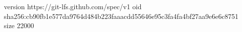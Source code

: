 version https://git-lfs.github.com/spec/v1
oid sha256:cb90fb1e577da9764d484b223faaacdd55646e95c3fa4fa4bf27aa9e6e6c8751
size 22000
